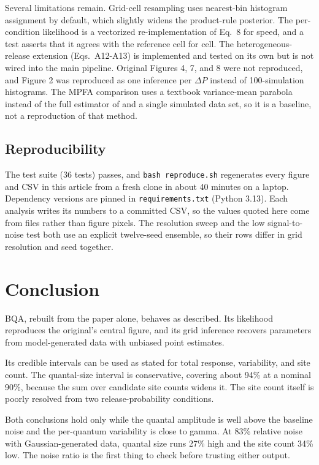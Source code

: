 \documentclass[a4paper, oneside, 10pt]{article}
\renewcommand{\citet}[1]{\citeauthor{#1}\supercite{#1}}
\begin{document}
Several limitations remain. Grid-cell resampling uses nearest-bin histogram assignment by default, which slightly widens the product-rule posterior. The per-condition likelihood is a vectorized re-implementation of Eq.~8 for speed, and a test asserts that it agrees with the reference cell for cell. The heterogeneous-release extension (Eqs.~A12-A13) is implemented and tested on its own but is not wired into the main pipeline. Original Figures 4, 7, and 8 were not reproduced, and Figure 2 was reproduced as one inference per \(\Delta P\) instead of 100-simulation histograms. The MPFA comparison uses a textbook variance-mean parabola instead of the full estimator of \citet{silver2003} and a single simulated data set, so it is a baseline, not a reproduction of that method.

\subsection{Reproducibility}

The test suite (36 tests) passes, and \texttt{bash\ reproduce.sh} regenerates every figure and CSV in this article from a fresh clone in about 40 minutes on a laptop. Dependency versions are pinned in \texttt{requirements.txt} (Python 3.13). Each analysis writes its numbers to a committed CSV, so the values quoted here come from files rather than figure pixels. The resolution sweep and the low signal-to-noise test both use an explicit twelve-seed ensemble, so their rows differ in grid resolution and seed together.

\section{Conclusion}

BQA, rebuilt from the paper alone, behaves as described. Its likelihood reproduces the original's central figure, and its grid inference recovers parameters from model-generated data with unbiased point estimates.

Its credible intervals can be used as stated for total response, variability, and site count. The quantal-size interval is conservative, covering about 94\% at a nominal 90\%, because the sum over candidate site counts widens it. The site count itself is poorly resolved from two release-probability conditions.

Both conclusions hold only while the quantal amplitude is well above the baseline noise and the per-quantum variability is close to gamma. At 83\% relative noise with Gaussian-generated data, quantal size runs 27\% high and the site count 34\% low. The noise ratio is the first thing to check before trusting either output.
\end{document}
